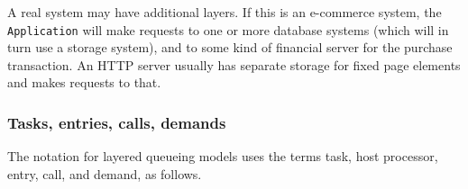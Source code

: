 \documentclass[11pt]{article}
\begin{document}
A real system may have additional layers. If this is an e-commerce system, the \texttt{Application}
will make requests to one or more database systems (which will in turn use a storage system), and
to some kind of financial server for the purchase transaction. An HTTP server usually has separate
storage for fixed page elements and makes requests to that.

\subsubsection{Tasks, entries, calls, demands}
\label{sec:tasks-entries-calls-demands}

The notation for layered queueing models uses the terms task, host processor, entry, call, 
and demand, as follows.
\end{document}
